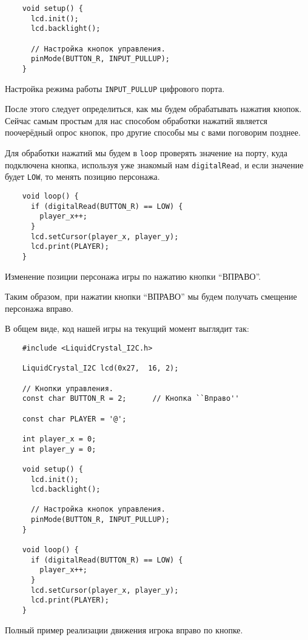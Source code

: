 \documentclass[../sparc.tex]{subfiles}
\begin{document}
\begin{listing}[H]
  \begin{verbatim}
    void setup() {
      lcd.init();
      lcd.backlight();

      // Настройка кнопок управления.
      pinMode(BUTTON_R, INPUT_PULLUP);
    }
  \end{verbatim}
  \caption{Настройка режима работы \texttt{INPUT\_PULLUP} цифрового порта.}
  \label{listing:game-dev-input-pullup-mode}
\end{listing}

После этого следует определиться, как мы будем обрабатывать нажатия кнопок.
Сейчас самым простым для нас способом обработки нажатий является поочерёдный
опрос кнопок, про другие способы мы с вами поговорим позднее.

Для обработки нажатий мы будем в \texttt{loop} проверять значение на порту, куда
подключена кнопка, используя уже знакомый нам \texttt{digitalRead}, и если
значение будет \texttt{LOW}, то менять позицию персонажа.

\begin{listing}[H]
  \begin{verbatim}
    void loop() {
      if (digitalRead(BUTTON_R) == LOW) {
        player_x++;
      }
      lcd.setCursor(player_x, player_y);
      lcd.print(PLAYER);
    }
  \end{verbatim}
  \caption{Изменение позиции персонажа игры по нажатию кнопки ``ВПРАВО''.}
  \label{listing:game-dev-button-right}
\end{listing}

Таким образом, при нажатии кнопки ``ВПРАВО'' мы будем получать смещение
персонажа вправо.

В общем виде, код нашей игры на текущий момент выглядит так:

\begin{listing}[H]
  \begin{verbatim}
    #include <LiquidCrystal_I2C.h>

    LiquidCrystal_I2C lcd(0x27,  16, 2);

    // Кнопки управления.
    const char BUTTON_R = 2;      // Кнопка ``Вправо''

    const char PLAYER = '@';

    int player_x = 0;
    int player_y = 0;

    void setup() {
      lcd.init();
      lcd.backlight();

      // Настройка кнопок управления.
      pinMode(BUTTON_R, INPUT_PULLUP);
    }

    void loop() {
      if (digitalRead(BUTTON_R) == LOW) {
        player_x++;
      }
      lcd.setCursor(player_x, player_y);
      lcd.print(PLAYER);
    }
  \end{verbatim}
  \caption{Полный пример реализации движения игрока вправо по кнопке.}
  \label{listing:game-dev-button-right-full-example}
\end{listing}
\end{document}
